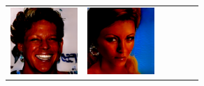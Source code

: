 \documentclass{article}
\newcommand{\pganw}{1.0in}
\begin{document}
\begin{table}[htbp]
\begin{center}
\begin{tabular}{cc|cc|cc}
\includegraphics[width=\pganw]{figures/pgan/6_base_raw_base.png} &
\includegraphics[width=\pganw]{figures/pgan/7_base_raw_base.png} &

\end{tabular}
\end{center}
\end{table}
\end{document}
